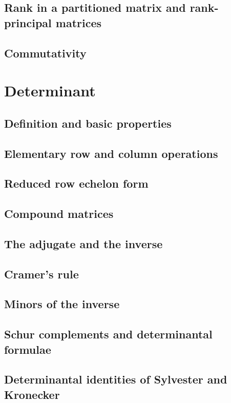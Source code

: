 \documentclass[11pt]{article}
\begin{document}
\subsection{Rank in a partitioned matrix and rank-principal matrices}

\subsection{Commutativity}


\section{Determinant}
\subsection{Definition and basic properties}
\subsection{Elementary row and column operations}

\subsection{Reduced row echelon form}

\subsection{Compound matrices}

\subsection{The adjugate and the inverse}

\subsection{Cramer’s rule}

\subsection{Minors of the inverse}

\subsection{Schur complements and determinantal formulae}

\subsection{Determinantal identities of Sylvester and Kronecker}
\end{document}
